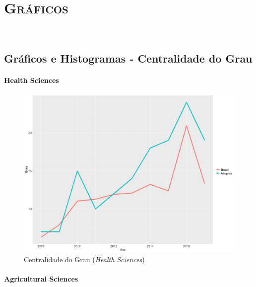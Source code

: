 \chapter{\textsc{Gráficos}}~\label{graficos}


\section{\textbf{Gráficos e Histogramas - Centralidade do Grau}}


\subsubsection{Health Sciences}

\begin{figure}[H]
	\centering
	\includegraphics[scale=0.6]{Imagens/graf-linha-degree-br-al.pdf}
	\caption{Centralidade do Grau (\textit{Health Sciences})}
	\label{degree-health}
\end{figure}

\subsubsection{Agricultural Sciences}

